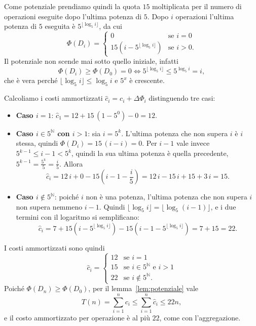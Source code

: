 Come potenziale prendiamo quindi la quota $15$ moltiplicata per il numero di operazioni eseguite dopo l'ultima potenza di $5$. Dopo $i$ operazioni l'ultima potenza di $5$ eseguita è $5^{\lfloor \log_5 i \rfloor}$, da cui
\[
\Phi(D_i) =
\begin{cases}
    0 & \text{se } i = 0 \\
    15\left(i - 5^{\lfloor \log_5 i \rfloor}\right) & \text{se } i > 0.
\end{cases}
\]
Il potenziale non scende mai sotto quello iniziale, infatti
\[
\Phi(D_i) \ge \Phi(D_0) = 0 \iff 5^{\lfloor \log_5 i \rfloor} \le 5^{\log_5 i} = i,
\]
che è vera perché $\lfloor \log_5 i \rfloor \le \log_5 i$ e $5^x$ è crescente.

Calcoliamo i costi ammortizzati $\hat{c}_i = c_i + \Delta\Phi_i$ distinguendo tre casi:
\begin{itemize}
    \item \textbf{Caso $i = 1$}: $\hat{c}_1 = 12 + 15\,(1 - 5^0) - 0 = 12$.
    \item \textbf{Caso $i \in 5^{\mathbb{N}}$ con $i > 1$}: sia $i = 5^k$. L'ultima potenza che non supera $i$ è $i$ stessa, quindi $\Phi(D_i) = 15\,(i - i) = 0$. Per $i - 1$ vale invece $5^{k-1} \le i - 1 < 5^k$, quindi la sua ultima potenza è quella precedente, $5^{k-1} = \frac{5^k}{5} = \frac{i}{5}$. Allora
    \[
    \hat{c}_i = 12\,i + 0 - 15\left(i - 1 - \frac{i}{5}\right) = 12\,i - 15\,i + 15 + 3\,i = 15.
    \]
    \item \textbf{Caso $i \notin 5^{\mathbb{N}}$}: poiché $i$ non è una potenza, l'ultima potenza che non supera $i$ non supera nemmeno $i - 1$. Quindi $\lfloor \log_5 i \rfloor = \lfloor \log_5 (i-1) \rfloor$, e i due termini con il logaritmo si semplificano:
    \[
    \hat{c}_i = 7 + 15\left(i - 5^{\lfloor \log_5 i \rfloor}\right) - 15\left(i - 1 - 5^{\lfloor \log_5 i \rfloor}\right) = 7 + 15 = 22.
    \]
\end{itemize}
I costi ammortizzati sono quindi
\[
\hat{c}_i =
\begin{cases}
    12 & \text{se } i = 1 \\
    15 & \text{se } i \in 5^{\mathbb{N}} \text{ e } i > 1 \\
    22 & \text{se } i \notin 5^{\mathbb{N}}.
\end{cases}
\]
Poiché $\Phi(D_n) \ge \Phi(D_0)$, per il lemma~\ref{lem:potenziale} vale
\[
T(n) = \sum_{i=1}^{n} c_i \le \sum_{i=1}^{n} \hat{c}_i \le 22n,
\]
e il costo ammortizzato per operazione è al più $22$, come con l'aggregazione.

